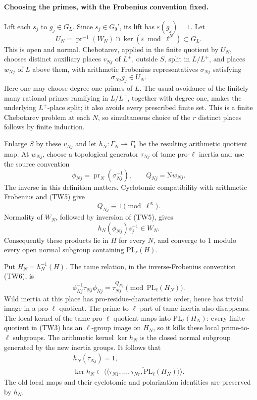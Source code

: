 \paragraph{Choosing the primes, with the Frobenius convention fixed.}
Lift each \(s_j\) to \(g_j\in G_L\).
Since \(s_j\in G_0'\), its lift has
\(\varepsilon(g_j)=1\).
Let
\[
 U_N=\operatorname{pr}^{-1}(W_N)
                 \cap\ker(\varepsilon\bmod\ell^N)\subset G_L .
\]
This is open and normal.
Chebotarev, applied in the finite quotient by \(U_N\), chooses
distinct auxiliary places \(v_{Nj}\) of \(L^+\), outside \(S\),
split in \(L/L^+\), and places \(w_{Nj}\) of \(L\) above them,
with arithmetic Frobenius representatives \(\sigma_{Nj}\)
satisfying
\[
                         \sigma_{Nj}g_j\in U_N .
 \tag{TW5}
\]
Here one may choose degree-one primes of \(L\).
The usual avoidance of the finitely many rational primes
ramifying in \(L/L^+\), together with degree one, makes the
underlying \(L^+\)-place split; it also avoids every prescribed
finite set.
This is a finite Chebotarev problem at each \(N\), so simultaneous
choice of the \(r\) distinct places follows by finite induction.

Enlarge \(S\) by these \(v_{Nj}\) and let
\(h_N:\Gamma_N\twoheadrightarrow\Gamma_0\) be the resulting
arithmetic quotient map.
At \(w_{Nj}\), choose a topological generator \(\tau_{Nj}\)
of tame pro-\(\ell\) inertia and use the source convention
\[
             \phi_{Nj}=\operatorname{pr}_N(\sigma_{Nj}^{-1}),
 \qquad Q_{Nj}=\mathrm Nw_{Nj}.
 \tag{TW6}
\]
The inverse in this definition matters.
Cyclotomic compatibility with arithmetic Frobenius and (TW5)
give
\[
                           Q_{Nj}\equiv1\pmod{\ell^N}.
 \tag{TW7}
\]
Normality of \(W_N\), followed by inversion of (TW5), gives
\[
             h_N(\phi_{Nj})s_j^{-1}\in W_N .
 \tag{TW8}
\]
Consequently these products lie in \(H\) for every \(N\), and
converge to \(1\) modulo every open normal subgroup containing
\(\mathrm{PL}_\ell(H)\).

Put \(H_N=h_N^{-1}(H)\).
The tame relation, in the inverse-Frobenius convention (TW6),
is
\[
 \phi_{Nj}^{-1}\tau_{Nj}\phi_{Nj}
       =\tau_{Nj}^{Q_{Nj}}
                        \pmod{\mathrm{PL}_\ell(H_N)}.
 \tag{TW9}
\]
Wild inertia at this place has pro-residue-characteristic order,
hence has trivial image in a pro-\(\ell\) quotient.
The prime-to-\(\ell\) part of tame inertia also disappears.
The local kernel of the tame pro-\(\ell\) quotient maps into
\(\mathrm{PL}_\ell(H_N)\): every finite quotient in (TW3) has
an \(\ell\)-group image on \(H_N\), so it kills these local
prime-to-\(\ell\) subgroups.
The arithmetic kernel \( \ker h_N\) is the closed normal subgroup
generated by the new inertia groups.
It follows that
\[
 \begin{gathered}
 h_N(\tau_{Nj})=1,\\
 \ker h_N\subset
 \overline{\langle\!\langle
       \tau_{N1},\ldots,\tau_{Nr},
                         \mathrm{PL}_\ell(H_N)\rangle\!\rangle}.
 \tag{TW10}
 \end{gathered}
\]
The old local maps and their cyclotomic and polarization
identities are preserved by \(h_N\).

